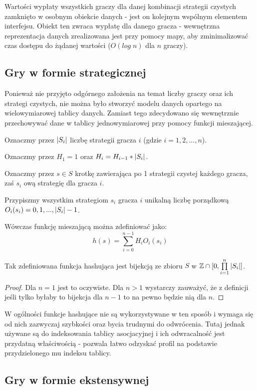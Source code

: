 \documentclass[polish]{standalone}
\begin{document}
Wartości wypłaty wszystkich graczy dla danej kombinacji strategii czystych zamknięto w osobnym obiekcie danych - jest on
kolejnym wspólnym elementem interfejsu. Obiekt ten zwraca wypłatę dla danego gracza - wewnętrzna reprezentacja danych
zrealizowana jest przy pomocy mapy, aby zminimalizować czas dostępu do żądanej wartości ($O(log\;n)$ dla $n$ graczy).

\subsection{Gry w formie strategicznej}

Ponieważ nie przyjęto odgórnego założenia na temat liczby graczy oraz ich strategi czystych, nie można było stworzyć
modelu danych opartego na wielowymiarowej tablicy danych. Zamiast tego zdecydowano się wewnętrznie przechowywać dane
w tablicy jednowymiarowej przy pomocy funkcji mieszającej.

Oznaczmy przez $|S_i|$ liczbę strategii gracza $i$ (gdzie $i = 1, 2, ..., n$).

Oznaczmy przez $H_1 = 1$ oraz $H_i = H_{i-1} * |S_i|$.

Oznaczmy przez $s \in S$ krotkę zawierająca po 1 strategii czystej każdego gracza, zaś $s_i$ ową strategię
dla gracza $i$.

Przypiszmy wszystkim strategiom $s_i$ gracza $i$ unikalną liczbę porządkową $O_i(s_i) = 0, 1, ..., |S_i|-1$.

Wówczas funkcję mieszającą można zdefiniować jako:
$$h(s) = \sum\limits_{i=0}^{n-1} H_i O_i(s_i)$$

\begin{theorem}
Tak zdefiniowana funkcja hashująca jest bijekcją ze zbioru $S$ w $ \mathbb{Z} \cap [0, \prod\limits_{i=1}^{n} |S_i|] $.
\end{theorem}

\begin{proof}
Dla $n = 1$ jest to oczywiste. Dla $n > 1$ wystarczy zauważyć, że z definicji jeśli tylko byłaby to bijekcja dla $n-1$
to na pewno będzie nią dla $n$.
\end{proof}

W ogólności funkcje hashujące nie są wykorzystywane w ten sposób i wymaga się od nich zazwyczaj szybkości oraz bycia
trudnymi do odwrócenia. Tutaj jednak używane są do indeksowania tablicy asocjacyjnej i ich odwracalność jest przydatną
właściwością - pozwala łatwo odzyskać profil na podstawie przydzielonego mu indeksu tablicy.

\subsection{Gry w formie ekstensywnej}
\end{document}
